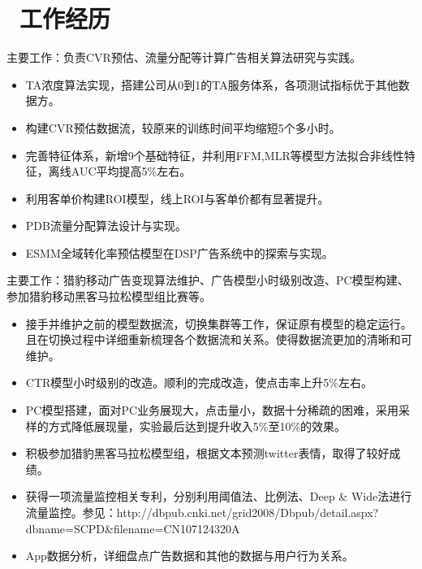 \documentclass{resume}
\begin{document}



\section{\faUsers\ 工作经历}
\role{CTR、CVR预估}{广告算法工程师}
\begin{onehalfspacing}
主要工作：负责CVR预估、流量分配等计算广告相关算法研究与实践。
\begin{itemize}
\item TA浓度算法实现，搭建公司从0到1的TA服务体系，各项测试指标优于其他数据方。 
\item 构建CVR预估数据流，较原来的训练时间平均缩短5个多小时。
\item 完善特征体系，新增9个基础特征，并利用FFM,MLR等模型方法拟合非线性特征，离线AUC平均提高5\%左右。
\item 利用客单价构建ROI模型，线上ROI与客单价都有显著提升。
\item PDB流量分配算法设计与实现。 
\item ESMM全域转化率预估模型在DSP广告系统中的探索与实现。
\end{itemize}
\end{onehalfspacing}

\begin{onehalfspacing}
主要工作：猎豹移动广告变现算法维护、广告模型小时级别改造、PC模型构建、参加猎豹移动黑客马拉松模型组比赛等。
\begin{itemize}
  \item 接手并维护之前的模型数据流，切换集群等工作，保证原有模型的稳定运行。且在切换过程中详细重新梳理各个数据流和关系。使得数据流更加的清晰和可维护。 
  \item CTR模型小时级别的改造。顺利的完成改造，使点击率上升5\%左右。
  \item PC模型搭建，面对PC业务展现大，点击量小，数据十分稀疏的困难，采用采样的方式降低展现量，实验最后达到提升收入5\%至10\%的效果。
  \item 积极参加猎豹黑客马拉松模型组，根据文本预测twitter表情，取得了较好成绩。
  \item 获得一项流量监控相关专利，分别利用阈值法、比例法、Deep \& Wide法进行流量监控。参见：http://dbpub.cnki.net/grid2008/Dbpub/detail.aspx?dbname=SCPD\&filename=CN107124320A
  \item App数据分析，详细盘点广告数据和其他的数据与用户行为关系。
\end{itemize}
\end{onehalfspacing}
\end{document}
